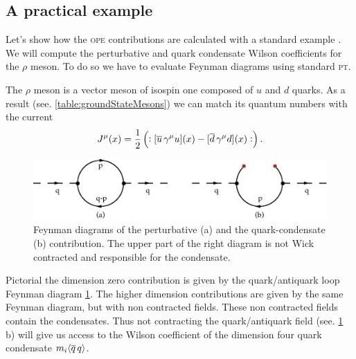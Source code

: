 \documentclass[../../index.tex]{subfiles}
\begin{document}
\subsection{A practical example}
Let's show how the \textsc{ope} contributions are calculated with a standard
example \cite{Shifman1978, Pascual1984}. We will compute the perturbative and
quark condensate Wilson coefficients for the \(\rho\) meson. To do so we have to
evaluate Feynman diagrams using standard \textsc{pt}.

The \(\rho\) meson is a vector meson of isospin one composed of \(u\) and \(d\)
quarks. As a result (see. \cref{table:groundStateMesons}) we can match its
quantum numbers with the current
\begin{equation}
  J^\mu(x) = \frac{1}{2}\left(:[\overline{u}\, \gamma^\mu u](x) - [\overline{d}\, \gamma^\mu d](x):\right).
\end{equation}
\begin{figure}
  \centering
  \includegraphics[width=\textwidth]{./images/condensateFeynmanDiagram.eps}
  \caption{Feynman diagrams of the perturbative (a) and the quark-condensate (b)
    contribution. The upper part of the right diagram is not Wick contracted and
    responsible for the condensate.}
  \label{fig:OPEFeynmanDiagram}
\end{figure}
Pictorial the dimension zero contribution is given by the quark\-/antiquark loop
Feynman diagram \cref{fig:OPEFeynmanDiagram}. The higher dimension contributions
are given by the same Feynman diagram, but with non contracted fields. These non
contracted fields contain the condensates. Thus not contracting the
quark\-/antiquark field (see. \cref{fig:OPEFeynmanDiagram} b) will give us
access to the Wilson coefficient of the dimension four quark condensate \(m_i
\langle \overline{q}\,q \rangle\).
\end{document}
